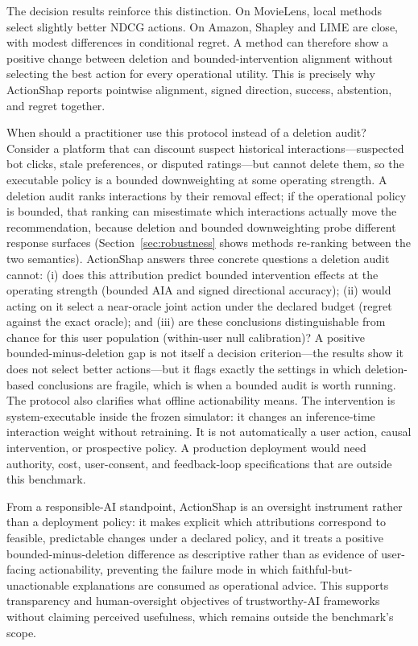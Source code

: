 \documentclass[a4paper,fleqn,doubleblind]{cas-sc}
\begin{document}
The decision results reinforce this distinction. On MovieLens, local methods select slightly better NDCG actions. On Amazon, Shapley and LIME are close, with modest differences in conditional regret. A method can therefore show a positive change between deletion and bounded-intervention alignment without selecting the best action for every operational utility. This is precisely why ActionShap reports pointwise alignment, signed direction, success, abstention, and regret together.

When should a practitioner use this protocol instead of a deletion audit? Consider a platform that can discount suspect historical interactions---suspected bot clicks, stale preferences, or disputed ratings---but cannot delete them, so the executable policy is a bounded downweighting at some operating strength. A deletion audit ranks interactions by their removal effect; if the operational policy is bounded, that ranking can misestimate which interactions actually move the recommendation, because deletion and bounded downweighting probe different response surfaces (Section~\ref{sec:robustness} shows methods re-ranking between the two semantics). ActionShap answers three concrete questions a deletion audit cannot: (i) does this attribution predict bounded intervention effects at the operating strength (bounded AIA and signed directional accuracy); (ii) would acting on it select a near-oracle joint action under the declared budget (regret against the exact oracle); and (iii) are these conclusions distinguishable from chance for this user population (within-user null calibration)? A positive bounded-minus-deletion gap is not itself a decision criterion---the results show it does not select better actions---but it flags exactly the settings in which deletion-based conclusions are fragile, which is when a bounded audit is worth running.
The protocol also clarifies what offline actionability means. The intervention is system-executable inside the frozen simulator: it changes an inference-time interaction weight without retraining. It is not automatically a user action, causal intervention, or prospective policy. A production deployment would need authority, cost, user-consent, and feedback-loop specifications that are outside this benchmark.

From a responsible-AI standpoint, ActionShap is an oversight instrument rather than a deployment policy: it makes explicit which attributions correspond to feasible, predictable changes under a declared policy, and it treats a positive bounded-minus-deletion difference as descriptive rather than as evidence of user-facing actionability, preventing the failure mode in which faithful-but-unactionable explanations are consumed as operational advice. This supports transparency and human-oversight objectives of trustworthy-AI frameworks without claiming perceived usefulness, which remains outside the benchmark's scope.
\end{document}

